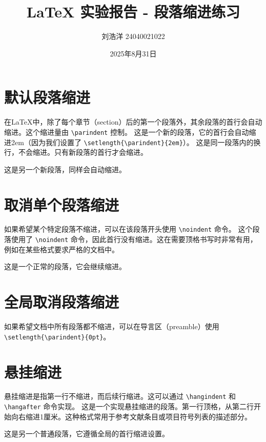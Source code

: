 \documentclass{article}
\title{LaTeX 实验报告 - 段落缩进练习}
\author{刘浩洋 24040021022}
\date{2025年8月31日}
\begin{document}
\maketitle

\section{默认段落缩进}
在LaTeX中，除了每个章节（section）后的第一个段落外，其余段落的首行会自动缩进。这个缩进量由 \texttt{\textbackslash parindent} 控制。
这是一个新的段落，它的首行会自动缩进2em（因为我们设置了 \texttt{\textbackslash setlength\{\textbackslash parindent\}\{2em\}}）。
这是同一段落内的换行，不会缩进。只有新段落的首行才会缩进。

这是另一个新段落，同样会自动缩进。

\section{取消单个段落缩进}
如果希望某个特定段落不缩进，可以在该段落开头使用 \texttt{\textbackslash noindent} 命令。
\noindent 这个段落使用了 \texttt{\textbackslash noindent} 命令，因此首行没有缩进。这在需要顶格书写时非常有用，例如在某些格式要求严格的文档中。

这是一个正常的段落，它会继续缩进。

\section{全局取消段落缩进}
如果希望文档中所有段落都不缩进，可以在导言区（preamble）使用 \texttt{\textbackslash setlength\{\textbackslash parindent\}\{0pt\}}。

\section{悬挂缩进}
悬挂缩进是指第一行不缩进，而后续行缩进。这可以通过 \texttt{\textbackslash hangindent} 和 \texttt{\textbackslash hangafter} 命令实现。
\hangindent=1cm %
这是一个实现悬挂缩进的段落。第一行顶格，从第二行开始向右缩进1厘米。这种格式常用于参考文献条目或项目符号列表的描述部分。

这是另一个普通段落，它遵循全局的首行缩进设置。
\end{document}
